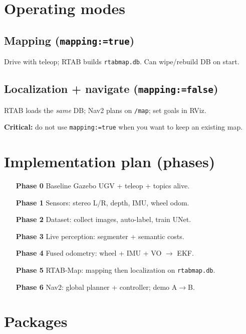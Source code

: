 \documentclass[11pt,a4paper]{article}
\begin{document}
\section{Operating modes}

\subsection{Mapping (\texttt{mapping:=true})}
Drive with teleop; RTAB builds \texttt{rtabmap.db}. Can wipe/rebuild DB on start.

\subsection{Localization + navigate (\texttt{mapping:=false})}
RTAB loads the \emph{same} DB; Nav2 plans on \texttt{/map}; set goals in RViz.

\textbf{Critical:} do not use \texttt{mapping:=true} when you want to keep an existing map.

\section{Implementation plan (phases)}

\begin{enumerate}[leftmargin=*,itemsep=0.3em]
  \item[\textbf{Phase 0}] Baseline Gazebo UGV + teleop + topics alive.
  \item[\textbf{Phase 1}] Sensors: stereo L/R, depth, IMU, wheel odom.
  \item[\textbf{Phase 2}] Dataset: collect images, auto-label, train UNet.
  \item[\textbf{Phase 3}] Live perception: segmenter + semantic costs.
  \item[\textbf{Phase 4}] Fused odometry: wheel + IMU + VO $\rightarrow$ EKF.
  \item[\textbf{Phase 5}] RTAB-Map: mapping then localization on \texttt{rtabmap.db}.
  \item[\textbf{Phase 6}] Nav2: global planner + controller; demo A$\rightarrow$B.
\end{enumerate}

\section{Packages}
\end{document}
